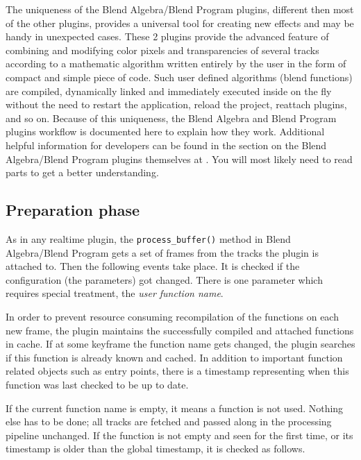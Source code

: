 The uniqueness of the Blend Algebra/Blend Program plugins, different then most of the other plugins, provides a universal tool for creating new effects and may be handy in unexpected cases.
These 2 plugins provide the advanced feature of combining and modifying color pixels and transparencies of several tracks according to a mathematic algorithm written entirely by the user in the form of compact and simple piece of code. Such user defined algorithms (blend functions) are compiled, dynamically linked and immediately executed inside \CGG{} on the fly without the need to restart the application, reload the project, reattach plugins, and so on.
Because of this uniqueness, the Blend Algebra and Blend Program plugins workflow is documented here to explain how they work. Additional helpful information for developers can be found in the section on the Blend Algebra/Blend Program plugins themselves at . You will most likely need to read parts to get a better understanding.

\subsection{Preparation phase}%
\label{preparatio_phase}

As in any realtime plugin, the \texttt{process\_buffer()} method in Blend Algebra/Blend Program gets a set of frames from the tracks the plugin is attached to. Then the following events take place. It is checked if the configuration (the parameters) got changed. There is one parameter which requires special treatment, the \textit{user function name}.

In order to prevent resource consuming recompilation of the functions on each new frame, the plugin maintains the successfully compiled and attached functions in cache. If at some keyframe the function name gets changed, the plugin searches if this function is already known and cached. In addition to important function related objects such as entry points, there is a timestamp representing  when this function was last checked to be up to date.

If the current function name is empty, it means a function is not used. Nothing else has to be done; all tracks are fetched and passed along in the processing pipeline unchanged. If the function is not empty and seen for the first time, or its timestamp is older than the global timestamp, it is checked as follows.

